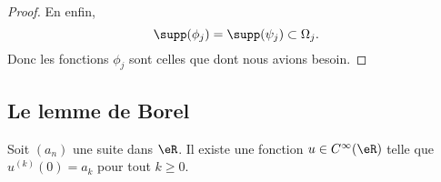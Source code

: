 \begin{proof}
	En enfin,
	\begin{equation}
		\supp(\phi_j)=\supp(\psi_j)\subset\Omega_j.
	\end{equation}
	Donc les fonctions \( \phi_j\) sont celles que dont nous avions besoin.
\end{proof}

\subsection{Le lemme de Borel}

\begin{lemma} \label{LemRENlIEL}
	Soit \( (a_n)\) une suite dans \( \eR\). Il existe une fonction \( u\in C^{\infty}(\eR)\) telle que \( u^{(k)}(0)=a_k\) pour tout \( k\geq 0\).
\end{lemma}

